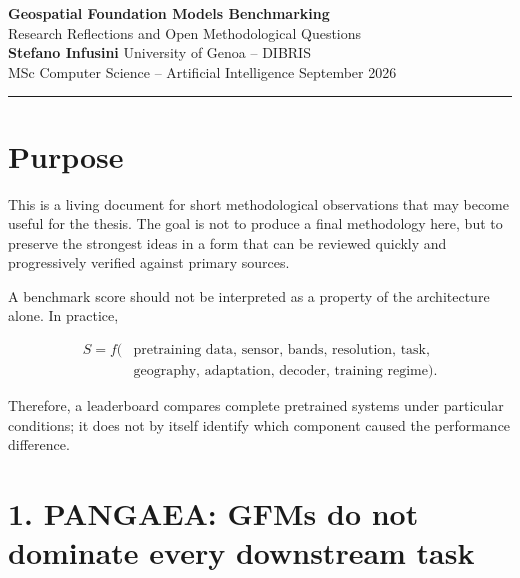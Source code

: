 \documentclass[11pt,a4paper]{article}
\begin{document}
\begin{flushleft}

    {\LARGE\textbf{Geospatial Foundation Models Benchmarking}}\\[0.3em]

    {\large\color{black!65}
    Research Reflections and Open Methodological Questions
    }\\[1.1em]

    \textbf{Stefano Infusini}
    \hfill
    University of Genoa -- DIBRIS\\[-0.1em]

    {\small\color{black!65}
    MSc Computer Science -- Artificial Intelligence
    }
    \hfill
    {\small September 2026}

\end{flushleft}

\vspace{-0.6em}
\rule{\textwidth}{0.4pt}
\vspace{1.0em}

\section*{Purpose}

This is a living document for short methodological observations that may become useful for the thesis.
The goal is not to produce a final methodology here, but to preserve the strongest ideas in a form
that can be reviewed quickly and progressively verified against primary sources.

A benchmark score should not be interpreted as a property of the architecture alone. In practice,

\[
\begin{aligned}
S=f(&\text{pretraining data, sensor, bands, resolution, task,}\\
    &\text{geography, adaptation, decoder, training regime}).
\end{aligned}
\]

Therefore, a leaderboard compares complete pretrained systems under particular conditions; it does
not by itself identify which component caused the performance difference.

\section{1. PANGAEA: GFMs do not dominate every downstream task}
\end{document}
